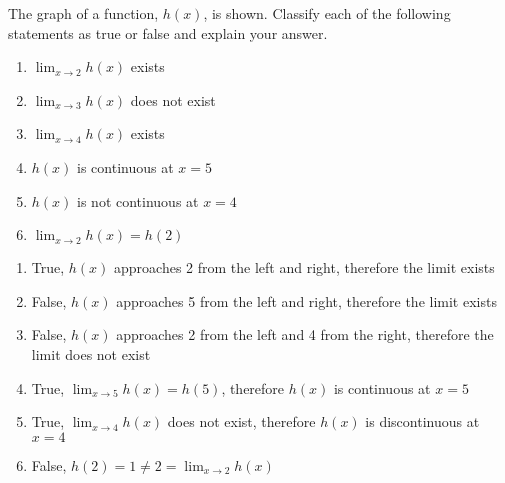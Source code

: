 \begin{Exercise}[label=limits6]
	The graph of a function, $h(x)$, is shown. Classify each of the following 
	statements as true or false and explain your answer. 
	\\
	\begin{enumerate}
	\item $\lim_{x\to2} h(x)$ exists
	\item $\lim_{x \to 3} h(x)$ does not exist
	\item $\lim_{x \to 4} h(x)$ exists
	\item $h(x)$ is continuous at $x=5$
	\item $h(x)$ is not continuous at $x=4$
	\item $\lim_{x \to 2} h(x) = h(2)$
	\end{enumerate}
\end{Exercise}

\begin{Answer}[ref=limits6]
	\begin{enumerate}
	\item True, $h(x)$ approaches 2 from the left and right, therefore the limit 
	exists
	\item False, $h(x)$ approaches 5 from the left and right, therefore the limit 
	exists
	\item False, $h(x)$ approaches 2 from the left and 4 from the right, therefore 
	the limit does not exist
	\item True, $\lim_{x \to 5}h(x) = h(5)$, therefore $h(x)$ is continuous at $x=5$
	\item True, $\lim_{x \to 4}h(x)$ does not exist, therefore $h(x)$ is 
	discontinuous at $x=4$
	\item False, $h(2) = 1 \neq 2 = \lim_{x \to 2}h(x)$
	\end{enumerate}
\end{Answer}

